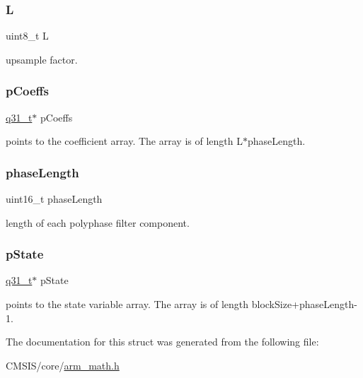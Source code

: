 \subsubsection{\texorpdfstring{L}{L}}
{\footnotesize\ttfamily uint8\+\_\+t L}

upsample factor. \mbox{\label{structarm__fir__interpolate__instance__q31_a68888e36167d81cb7836db10367a1682}} 
\subsubsection{\texorpdfstring{pCoeffs}{pCoeffs}}
{\footnotesize\ttfamily \mbox{\hyperlink{arm__math_8h_adc89a3547f5324b7b3b95adec3806bc0}{q31\+\_\+t}}$\ast$ p\+Coeffs}

points to the coefficient array. The array is of length L$\ast$phase\+Length. \mbox{\label{structarm__fir__interpolate__instance__q31_a8f92bb07e0812f94679438cdf412b26a}} 
\subsubsection{\texorpdfstring{phaseLength}{phaseLength}}
{\footnotesize\ttfamily uint16\+\_\+t phase\+Length}

length of each polyphase filter component. \mbox{\label{structarm__fir__interpolate__instance__q31_adee4ba3ee8869865af7d8fa08ca913d6}} 
\subsubsection{\texorpdfstring{pState}{pState}}
{\footnotesize\ttfamily \mbox{\hyperlink{arm__math_8h_adc89a3547f5324b7b3b95adec3806bc0}{q31\+\_\+t}}$\ast$ p\+State}

points to the state variable array. The array is of length block\+Size+phase\+Length-\/1. 

The documentation for this struct was generated from the following file\+:\begin{DoxyCompactItemize}
\item 
C\+M\+S\+I\+S/core/\mbox{\hyperlink{arm__math_8h}{arm\+\_\+math.\+h}}\end{DoxyCompactItemize}
